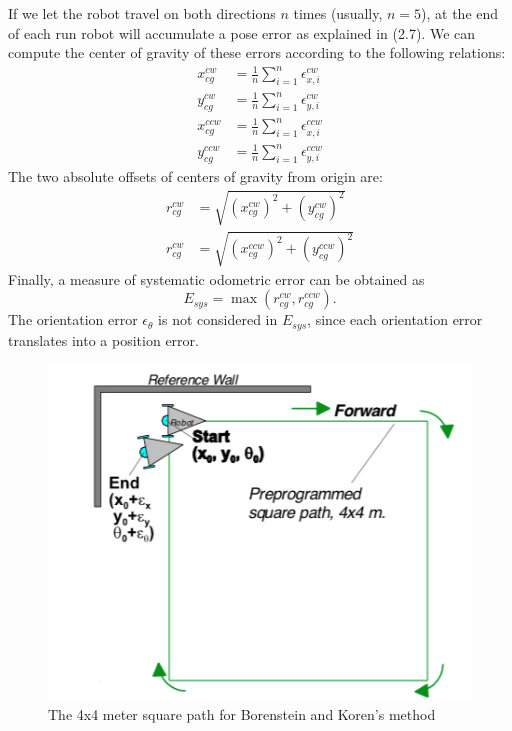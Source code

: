 \documentclass[a4paper, onecolumn]{report}
\begin{document}
If we let the robot travel on both directions $n$ times (usually, $n=5$), at the end of each run robot will accumulate a pose error as explained in (2.7). We can compute the center of gravity of these errors according to the following relations:
\begin{equation}
	\begin{aligned}
		x_{cg}^{cw} &= \frac{1}{n}\sum^n_{i=1}\epsilon_{x,i}^{cw} \\
		y_{cg}^{cw} &= \frac{1}{n}\sum^n_{i=1}\epsilon_{y,i}^{cw} \\
		x_{cg}^{ccw} &= \frac{1}{n}\sum^n_{i=1}\epsilon_{x,i}^{ccw} \\
		y_{cg}^{ccw} &= \frac{1}{n}\sum^n_{i=1}\epsilon_{y,i}^{ccw} 
	\end{aligned}
\end{equation}
The two absolute offsets of centers of gravity from origin are:
\begin{equation}
	\begin{aligned}
		r_{cg}^{cw} &= \sqrt{(x_{cg}^{cw})^2+(y_{cg}^{cw})^2} \\
		r_{cg}^{cw} &= \sqrt{(x_{cg}^{ccw})^2+(y_{cg}^{ccw})^2}
	\end{aligned}
\end{equation}
Finally, a measure of systematic odometric error can be obtained as
\begin{equation}
	E_{sys} = \max(r_{cg}^{cw},r_{cg}^{ccw}).
\end{equation}
The orientation error $\epsilon_\theta$ is not considered in $E_{sys}$, since each orientation error translates into a position error.
\begin{figure}[htbp]
\centering
\centering\setlength{\captionmargin}{0pt}%
\includegraphics[width=.50\textwidth]{images/unidirectional_nominal_path.jpeg}
\caption{The 4x4 meter square path for Borenstein and Koren's method}
\end{figure}
\end{document}
